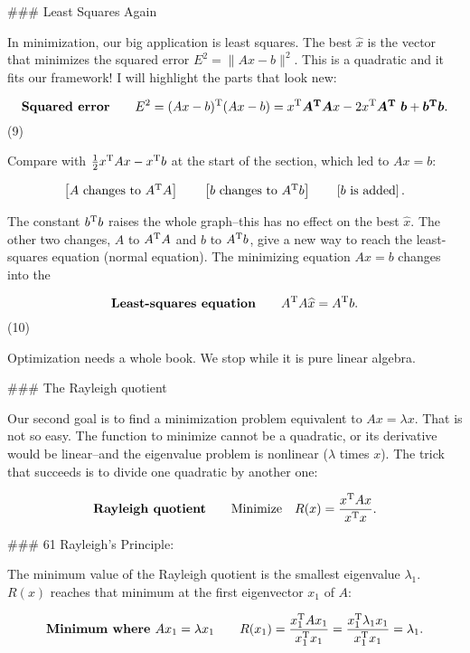 

### Least Squares Again

In minimization, our big application is least squares. The best \(\widehat{x}\) is the vector that minimizes the squared error \(E^{2}=\|Ax-b\|^{2}\). This is a quadratic and it fits our framework! I will highlight the parts that look new:

\[\mbox{\bf Squared error}\qquad E^{2}=(Ax-b)^{\rm T}(Ax-b)=x^{\rm T}\mbox{\boldmath$A ^{\rm T}$}\mbox{\boldmath$A$}x-2x^{\rm T}\mbox{\boldmath$A^{\rm T}$}\mbox{ \boldmath$b$}+\mbox{\boldmath$b^{\rm T}$}\mbox{\boldmath$b$}.\] (9)

Compare with \(\frac{1}{2}x^{\rm T}Ax-x^{\rm T}b\) at the start of the section, which led to \(Ax=b\):

\[\left[\mbox{$A$ changes to $A^{\rm T}$}A\right]\qquad\left[\mbox{$b$ changes to $A^{\rm T}$}b\right]\qquad\left[\mbox{$b$ is added}\right].\]

The constant \(b^{\rm T}b\) raises the whole graph--this has no effect on the best \(\widehat{x}\). The other two changes, \(A\) to \(A^{\rm T}A\) and \(b\) to \(A^{\rm T}b\), give a new way to reach the least-squares equation (normal equation). The minimizing equation \(Ax=b\) changes into the

\[\mbox{\bf Least-squares equation}\qquad A^{\rm T}A\widehat{x}=A^{\rm T}b.\] (10)

Optimization needs a whole book. We stop while it is pure linear algebra.

### The Rayleigh quotient

Our second goal is to find a minimization problem equivalent to \(Ax=\lambda x\). That is not so easy. The function to minimize cannot be a quadratic, or its derivative would be linear--and the eigenvalue problem is nonlinear (\(\lambda\) times \(x\)). The trick that succeeds is to divide one quadratic by another one:

\[\mbox{\bf Rayleigh quotient}\qquad\mbox{Minimize}\quad R(x)=\frac{x^{\rm T}Ax}{x^{ \rm T}x}.\]

### 61 Rayleigh's Principle:

The minimum value of the Rayleigh quotient is the smallest eigenvalue \(\lambda_{1}\). \(R(x)\) reaches that minimum at the first eigenvector \(x_{1}\) of \(A\):

\[\mbox{\bf Minimum where $Ax_{1}=\lambda x_{1}$}\qquad R(x_{1})=\frac{x_{1}^{ \rm T}Ax_{1}}{x_{1}^{\rm T}x_{1}}=\frac{x_{1}^{\rm T}\lambda_{1}x_{1}}{x_{1}^ {\rm T}x_{1}}=\lambda_{1}.\]